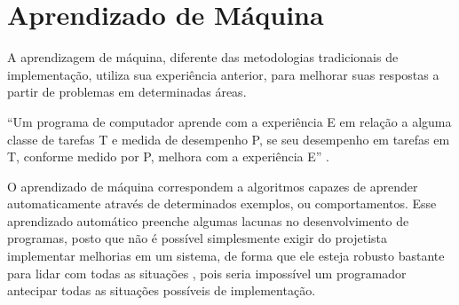 \section{Aprendizado de Máquina}\label{cap:refTeor:sec:aprendMaq}

 A aprendizagem de máquina, diferente das metodologias tradicionais de implementação, utiliza sua experiência anterior, para melhorar suas respostas a partir de problemas em determinadas áreas. 
 
 ``Um programa de computador aprende com a experiência E em relação a alguma classe de tarefas T e medida de desempenho P, se seu desempenho em tarefas em T, conforme medido por P, melhora com a experiência E'' \cite[p. 2]{Mitchell1997}. 
 
 

O aprendizado de máquina correspondem a algoritmos capazes de aprender automaticamente através de  determinados exemplos, ou comportamentos. Esse aprendizado automático preenche algumas lacunas no desenvolvimento de programas, posto que não é possível simplesmente exigir do projetista implementar melhorias em um sistema, de forma que ele esteja robusto bastante para lidar com todas as situações \cite{RusselStuart.Norvig2013}, pois seria impossível um programador antecipar todas as situações possíveis de implementação.



